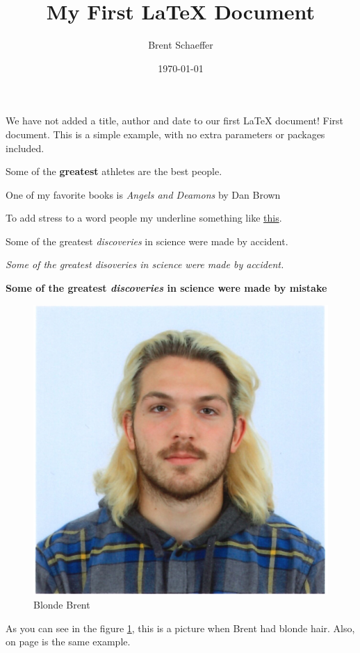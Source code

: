 \documentclass[11pt]{article}
\title{My First \LaTeX{} Document}
\author{Brent Schaeffer}
\date{\today}
\begin{document}
\maketitle

We have not added a title, author and date to our first \LaTeX{} document!
First document. This is a simple example, with no
extra parameters or packages included.

Some of the \textbf{greatest} athletes are the best people.

One of my favorite books is \textit{Angels and Deamons} by Dan Brown

To add stress to a word people my underline something like \underline{this}.

Some of the greatest \emph{discoveries} in science were made by accident.

\textit{Some of the greatest \emph{disoveries} in science were made by accident.}

\textbf{Some of the greatest \emph{discoveries} in science were made by mistake}

\begin{figure}[h]
    \centering
    \includegraphics{blonde}
    \caption{Blonde Brent}
    \label{fig:head1}
\end{figure}

As you can see in the figure \ref{fig:head1}, this is a picture when Brent
had blonde hair. Also, on page \pageref{fig:head1} is the same example.
\end{document}
